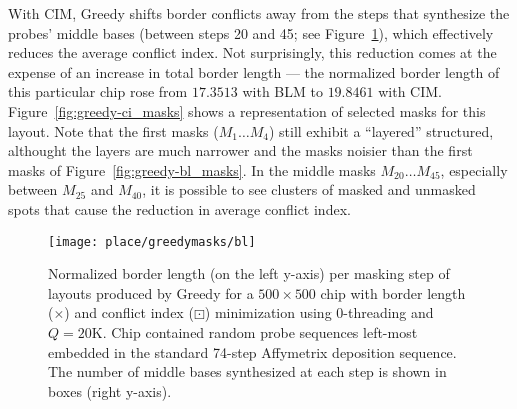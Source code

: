 With CIM, Greedy shifts border conflicts away from the steps that synthesize the
probes' middle bases (between steps 20 and 45; see Figure~\ref{fig:greedy_blm}),
which effectively reduces the average conflict index. Not surprisingly, this
reduction comes at the expense of an increase in total border length --- the
normalized border length of this particular chip rose from $17.3513$ with BLM to
$19.8461$ with CIM. Figure~\ref{fig:greedy-ci_masks} shows a representation of
selected masks for this layout. Note that the first masks ($M_1 \dots M_4$)
still exhibit a ``layered'' structured, althought the layers are much narrower
and the masks noisier than the first masks of Figure~\ref{fig:greedy-bl_masks}.
In the middle masks $M_{20} \dots M_{45}$, especially between $M_{25}$ and
$M_{40}$, it is possible to see clusters of masked and unmasked spots that cause
the reduction in average conflict index.

\begin{figure}[t]\centering
\texttt{[image: place/greedymasks/bl]}
\caption{\label{fig:greedy_blm}%
  Normalized border length (on the left y-axis) per masking step
  of layouts produced by Greedy for a $500\times 500$ chip with border length
  ({\tiny $\times$}) and conflict index ({\tiny $\boxdot$}) minimization using
  $0$-threading and $Q=20$K. Chip contained random probe sequences left-most
  embedded in the standard 74-step Affymetrix deposition sequence. The number of
  middle bases synthesized at each step is shown in boxes (right y-axis).}
\end{figure}

